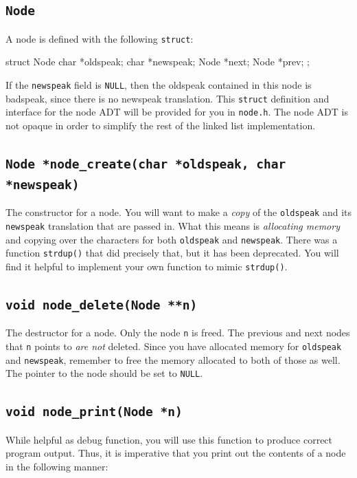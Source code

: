 \documentclass{article}
\begin{document}
\subsection{\texttt{Node}}

A node is defined with the following \texttt{struct}:

\begin{codelisting}{}
struct Node {
  char *oldspeak;
  char *newspeak;
  Node *next;
  Node *prev;
};
\end{codelisting}

If the \texttt{newspeak} field is \texttt{NULL}, then the oldspeak
contained in this node is badspeak, since there is no newspeak
translation. This \texttt{struct} definition and interface for the node
ADT will be provided for you in \texttt{node.h}. The node ADT is not
opaque in order to simplify the rest of the linked list implementation.

\subsection{\texttt{Node *node\_create(char *oldspeak, char *newspeak)}}

The constructor for a node. You will want to make a \emph{copy} of the
\texttt{oldspeak} and its \texttt{newspeak} translation that are passed
in. What this means is \emph{allocating memory} and copying over the
characters for both \texttt{oldspeak} and \texttt{newspeak}. There was a
function \texttt{strdup()} that did precisely that, but it has been
deprecated. You will find it helpful to implement your own function to
mimic \texttt{strdup()}.

\subsection{\texttt{void node\_delete(Node **n)}}

The destructor for a node. Only the node \texttt{n} is freed. The
previous and next nodes that \texttt{n} points to \emph{are not}
deleted. Since you have allocated memory for \texttt{oldspeak} and
\texttt{newspeak}, remember to free the memory allocated to both of
those as well. The pointer to the node should be set to \texttt{NULL}.

\subsection{\texttt{void node\_print(Node *n)}}

While helpful as debug function, you will use this function to produce
correct program output. Thus, it is imperative that you print out the
contents of a node in the following manner:
\end{document}
